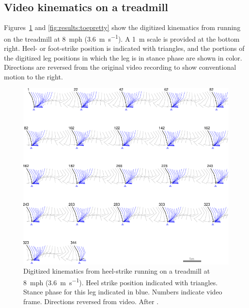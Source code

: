 \subsection{Video kinematics on a treadmill}
Figures~\ref{fig:results:heelpretty} and \ref{fig:results:toepretty} show the digitized kinematics from running on the treadmill at \SI{8}{mph} (\SI{3.6}{\meter\per\second}). A \SI{1}{\meter} scale is provided at the bottom right. Heel- or foot-strike position is indicated with triangles, and the portions of the digitized leg positions in which the leg is in stance phase are shown in color. Directions are reversed from the original video recording to show conventional motion to the right. 
\begin{figure}[p]
\begin{center}
\includegraphics{data/heel-pretty.pdf}
\end{center}
\caption{Digitized kinematics from heel-strike running on a treadmill at \SI{8}{mph} (\SI{3.6}{\meter\per\second}). Heel strike position indicated with triangles. Stance phase for this leg indicated in blue. Numbers indicate video frame. Directions reversed from video. After \citep{marey1873locomotion, muybridge1901human}.}  
\label{fig:results:heelpretty}
\end{figure}

